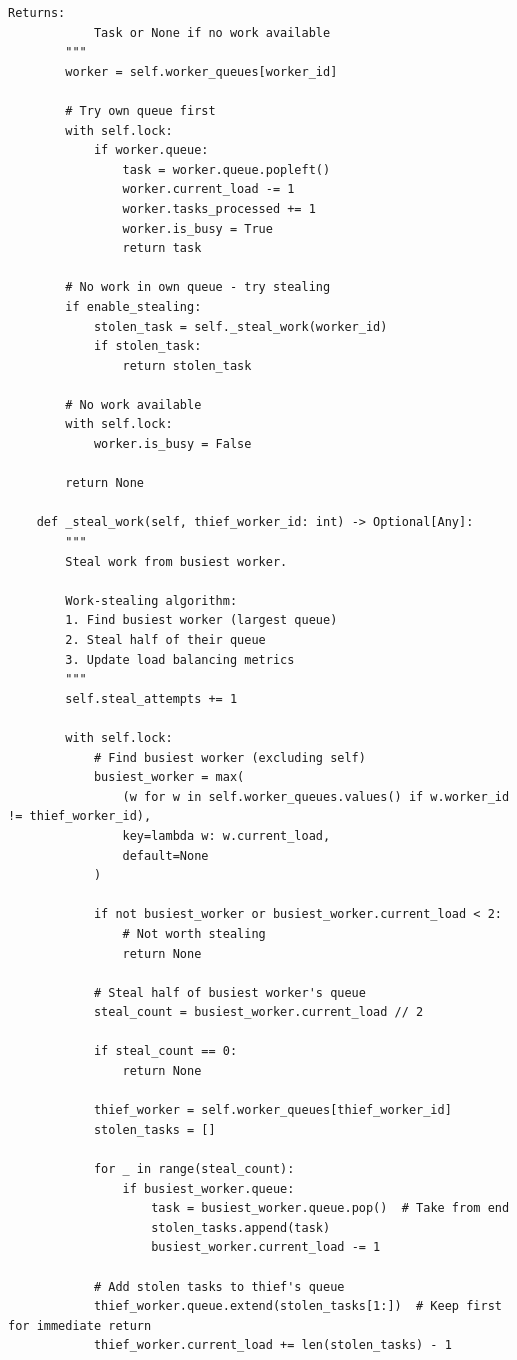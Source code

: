 \begin{lstlisting}[style=python, caption={Load Balancer with Work Stealing}]
        Returns:
            Task or None if no work available
        """
        worker = self.worker_queues[worker_id]

        # Try own queue first
        with self.lock:
            if worker.queue:
                task = worker.queue.popleft()
                worker.current_load -= 1
                worker.tasks_processed += 1
                worker.is_busy = True
                return task

        # No work in own queue - try stealing
        if enable_stealing:
            stolen_task = self._steal_work(worker_id)
            if stolen_task:
                return stolen_task

        # No work available
        with self.lock:
            worker.is_busy = False

        return None

    def _steal_work(self, thief_worker_id: int) -> Optional[Any]:
        """
        Steal work from busiest worker.

        Work-stealing algorithm:
        1. Find busiest worker (largest queue)
        2. Steal half of their queue
        3. Update load balancing metrics
        """
        self.steal_attempts += 1

        with self.lock:
            # Find busiest worker (excluding self)
            busiest_worker = max(
                (w for w in self.worker_queues.values() if w.worker_id != thief_worker_id),
                key=lambda w: w.current_load,
                default=None
            )

            if not busiest_worker or busiest_worker.current_load < 2:
                # Not worth stealing
                return None

            # Steal half of busiest worker's queue
            steal_count = busiest_worker.current_load // 2

            if steal_count == 0:
                return None

            thief_worker = self.worker_queues[thief_worker_id]
            stolen_tasks = []

            for _ in range(steal_count):
                if busiest_worker.queue:
                    task = busiest_worker.queue.pop()  # Take from end
                    stolen_tasks.append(task)
                    busiest_worker.current_load -= 1

            # Add stolen tasks to thief's queue
            thief_worker.queue.extend(stolen_tasks[1:])  # Keep first for immediate return
            thief_worker.current_load += len(stolen_tasks) - 1


\end{lstlisting}
